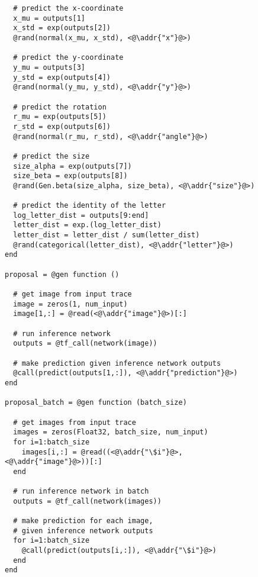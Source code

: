 \begin{figure}[t]
\begin{minipage}[t]{0.4\textwidth}
\begin{lstlisting}
  # predict the x-coordinate
  x_mu = outputs[1]
  x_std = exp(outputs[2])
  @rand(normal(x_mu, x_std), <@\addr{"x"}@>)

  # predict the y-coordinate
  y_mu = outputs[3]
  y_std = exp(outputs[4])
  @rand(normal(y_mu, y_std), <@\addr{"y"}@>)

  # predict the rotation
  r_mu = exp(outputs[5])
  r_std = exp(outputs[6])
  @rand(normal(r_mu, r_std), <@\addr{"angle"}@>)

  # predict the size 
  size_alpha = exp(outputs[7])
  size_beta = exp(outputs[8])
  @rand(Gen.beta(size_alpha, size_beta), <@\addr{"size"}@>)
  
  # predict the identity of the letter
  log_letter_dist = outputs[9:end]
  letter_dist = exp.(log_letter_dist)
  letter_dist = letter_dist / sum(letter_dist)
  @rand(categorical(letter_dist), <@\addr{"letter"}@>)
end

proposal = @gen function ()

  # get image from input trace
  image = zeros(1, num_input)
  image[1,:] = @read(<@\addr{"image"}@>)[:]

  # run inference network
  outputs = @tf_call(network(image))

  # make prediction given inference network outputs
  @call(predict(outputs[1,:]), <@\addr{"prediction"}@>)
end

proposal_batch = @gen function (batch_size)

  # get images from input trace
  images = zeros(Float32, batch_size, num_input)
  for i=1:batch_size
    images[i,:] = @read((<@\addr{"\$i"}@>, <@\addr{"image"}@>))[:]
  end

  # run inference network in batch
  outputs = @tf_call(network(images))
  
  # make prediction for each image,
  # given inference network outputs
  for i=1:batch_size
    @call(predict(outputs[i,:]), <@\addr{"\$i"}@>)
  end
end
\end{lstlisting}
\end{minipage}
\caption{}
\label{fig:proposal-code-figure}
\end{figure}


